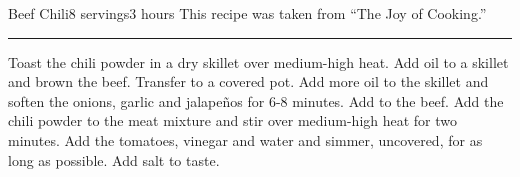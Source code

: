 \begin{recipe}{Beef Chili}{8 servings}{3 hours}
\freeform This recipe was taken from ``The Joy of Cooking.''\\
\rule{\textwidth}{0.05pt}
Toast the chili powder in a dry skillet over medium-high heat.
Add oil to a skillet and brown the beef.  Transfer to a covered pot. 
Add more oil to the skillet and soften the onions, garlic and jalape\~{n}os for 6-8 minutes.  Add to the beef.
\newstep
Add the chili powder to the meat mixture and stir over medium-high heat for two minutes.
Add the tomatoes, vinegar and water and simmer, uncovered, for as long as possible.  Add salt to taste.
\end{recipe}

